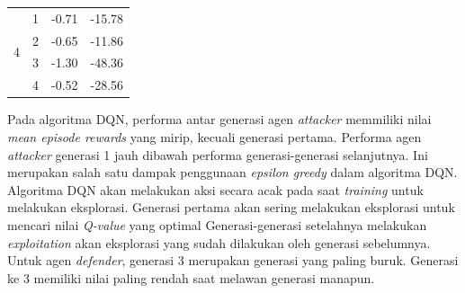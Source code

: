 \begin{table}[H]
\begin{tabular}{|c|c|c|c|}
  \multirow{4}{*}{4}                                                           & 1                                                                            & -0.71                                                                            & -15.78                                                                           \\ \cline{2-4} 
                                                                               & 2                                                                            & -0.65                                                                            & -11.86                                                                           \\ \cline{2-4} 
                                                                               & 3                                                                            & -1.30                                                                            & -48.36                                                                           \\ \cline{2-4} 
                                                                               & 4                                                                            & -0.52                                                                            & -28.56                                                                           \\ \hline
  \end{tabular}
\end{table}

Pada algoritma DQN, performa antar generasi agen \emph{attacker} memmiliki nilai \emph{mean episode rewards} yang mirip, kecuali generasi pertama.
Performa agen \emph{attacker} generasi 1 jauh dibawah performa generasi-generasi selanjutnya.
Ini merupakan salah satu dampak penggunaan \emph{epsilon greedy} dalam algoritma DQN.
Algoritma DQN akan melakukan aksi secara acak pada saat \emph{training} untuk melakukan eksplorasi.
Generasi pertama akan sering melakukan eksplorasi untuk mencari nilai \emph{Q-value} yang optimal
Generasi-generasi setelahnya melakukan \emph{exploitation} akan eksplorasi yang sudah dilakukan oleh generasi sebelumnya.
Untuk agen \emph{defender}, generasi 3 merupakan generasi yang paling buruk.
Generasi ke 3 memiliki nilai paling rendah saat melawan generasi manapun.

